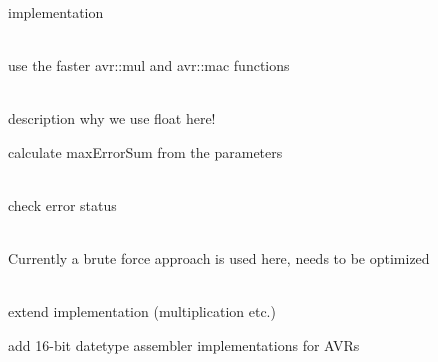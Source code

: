 \begin{DoxyRefList}
\item[{\parbox[t]{\linewidth}{Class \doxylink{classmodm_1_1_linked_list}{modm::\+Linked\+List\texorpdfstring{$<$}{<} T, Allocator \texorpdfstring{$>$}{>}} }}]\hfill \\
\label{todo__todo000005}%
%
implementation 
\item[{\parbox[t]{\linewidth}{Class \doxylink{classmodm_1_1_pid}{modm::\+Pid\texorpdfstring{$<$}{<} T, Scale\+Factor \texorpdfstring{$>$}{>}} }}]\hfill \\
\label{todo__todo000007}%
%
use the faster avr::\+mul and avr::\+mac functions 
\item[{\parbox[t]{\linewidth}{Member \doxylink{structmodm_1_1_pid_1_1_parameter_aecf7d0b0f133c75f2eeb51db466e51ee}{modm::\+Pid\texorpdfstring{$<$}{<} T, Scale\+Factor \texorpdfstring{$>$}{>}::\+Parameter::\+Parameter} (const float \&kp=0, const float \&ki=0, const float \&kd=0, const T \&max\+Error\+Sum=0, const T \&max\+Output=0)}}]\hfill \\
\label{todo__todo000008}%
%
description why we use float here! 



calculate max\+Error\+Sum from the parameters  
\item[{\parbox[t]{\linewidth}{Class \doxylink{classmodm_1_1platform_1_1_random_number_generator}{modm::\+platform::\+Random\+Number\+Generator} }}]\hfill \\
\label{todo__todo000016}%
%
check error status 
\item[{\parbox[t]{\linewidth}{Member \doxylink{classmodm_1_1_polygon2_d_adb66c10a6954012d6a517a312ced40ac}{modm::\+Polygon2D\texorpdfstring{$<$}{<} T \texorpdfstring{$>$}{>}::\+intersects} (const \doxylink{classmodm_1_1_polygon2_d}{Polygon2D} \&other) const}}]\hfill \\
\label{todo__todo000014}%
%
Currently a brute force approach is used here, needs to be optimized  
\item[{\parbox[t]{\linewidth}{Class \doxylink{classmodm_1_1_saturated}{modm::\+Saturated\texorpdfstring{$<$}{<} T \texorpdfstring{$>$}{>}} }}]\hfill \\
\label{todo__todo000015}%
%
extend implementation (multiplication etc.) 



add 16-\/bit datetype assembler implementations for AVRs 




\end{DoxyRefList}
